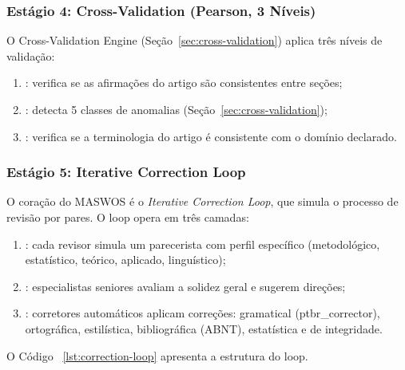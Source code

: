 \subsubsection{Estágio 4: Cross-Validation (Pearson, 3 Níveis)}

O Cross-Validation Engine (Seção~\ref{sec:cross-validation}) aplica
três níveis de validação:
\begin{enumerate}
\item {}: verifica se as
afirmações do artigo são consistentes entre seções;
\item {}: detecta 5 classes
de anomalias (Seção~\ref{sec:cross-validation});
\item {}: verifica se
a terminologia do artigo é consistente com o domínio declarado.
\end{enumerate}

\subsubsection{Estágio 5: Iterative Correction Loop}

O coração do MASWOS é o \textit{Iterative Correction Loop}, que
simula o processo de revisão por pares. O loop opera em três
camadas:

\begin{enumerate}
\item {}: cada revisor
simula um parecerista com perfil específico (metodológico,
estatístico, teórico, aplicado, linguístico);
\item {}: especialistas seniores
avaliam a solidez geral e sugerem direções;
\item {}: corretores automáticos
aplicam correções: gramatical (ptbr\_corrector), ortográfica,
estilística, bibliográfica (ABNT), estatística e de integridade.
\end{enumerate}

O Código~ \ref{lst:correction-loop} apresenta a estrutura do loop.

